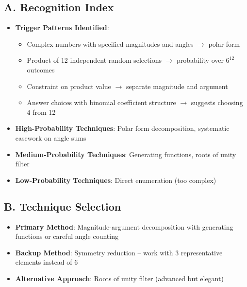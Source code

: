 \documentclass[]{article}
\begin{document}
\begin{techniquesbox}
\subsection*{A. Recognition Index}
\begin{itemize}[leftmargin=*]
    \item \textbf{Trigger Patterns Identified}:
    \begin{itemize}
        \item Complex numbers with specified magnitudes and angles $\rightarrow$ polar form
        \item Product of 12 independent random selections $\rightarrow$ probability over $6^{12}$ outcomes
        \item Constraint on product value $\rightarrow$ separate magnitude and argument
        \item Answer choices with binomial coefficient structure $\rightarrow$ suggests choosing 4 from 12
    \end{itemize}
    \item \textbf{High-Probability Techniques}: Polar form decomposition, systematic casework on angle sums
    \item \textbf{Medium-Probability Techniques}: Generating functions, roots of unity filter
    \item \textbf{Low-Probability Techniques}: Direct enumeration (too complex)
\end{itemize}

\subsection*{B. Technique Selection}
\begin{itemize}[leftmargin=*]
    \item \textbf{Primary Method}: Magnitude-argument decomposition with generating functions or careful angle counting
    \item \textbf{Backup Method}: Symmetry reduction -- work with 3 representative elements instead of 6
    \item \textbf{Alternative Approach}: Roots of unity filter (advanced but elegant)
\end{itemize}


\end{techniquesbox}
\end{document}
